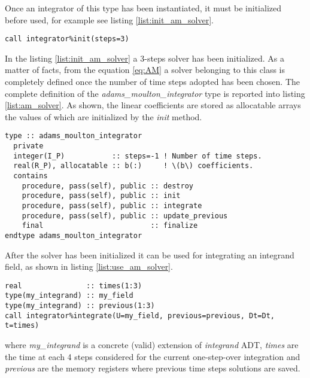 Once an integrator of this type has been instantiated, it must be initialized before used, for example see listing \ref{list:init_am_solver}.

\begin{lstlisting}[firstnumber=1,style=code,caption={example of initialization of an implicit Adams-Moulton integrator},label={list:init_am_solver}]
call integrator%init(steps=3)
\end{lstlisting}

In the listing \ref{list:init_am_solver} a 3-steps solver has been initialized. As a matter of facts, from the equation \ref{eq:AM} a solver belonging to this class is completely defined once the number of time steps adopted has been chosen. The complete definition of the \emph{adams\_moulton\_integrator} type is reported into listing \ref{list:am_solver}. As shown, the linear coefficients are stored as allocatable arrays the values of which are initialized by the \emph{init} method.

\begin{lstlisting}[firstnumber=1,style=code,caption={definition of \emph{adams\_moulton\_integrator} type},label={list:am_solver}]
type :: adams_moulton_integrator
  private
  integer(I_P)           :: steps=-1 ! Number of time steps.
  real(R_P), allocatable :: b(:)     ! \(b\) coefficients.
  contains
    procedure, pass(self), public :: destroy
    procedure, pass(self), public :: init
    procedure, pass(self), public :: integrate
    procedure, pass(self), public :: update_previous
    final                         :: finalize
endtype adams_moulton_integrator
\end{lstlisting}

After the solver has been initialized it can be used for integrating an integrand field, as shown in listing \ref{list:use_am_solver}.

\begin{lstlisting}[firstnumber=1,style=code,caption={example of usage of an Adams-Moulton integrator},label={list:use_am_solver}]
real               :: times(1:3)
type(my_integrand) :: my_field
type(my_integrand) :: previous(1:3)
call integrator%integrate(U=my_field, previous=previous, Dt=Dt, t=times)
\end{lstlisting}
where \emph{my\_integrand} is a concrete (valid) extension of \emph{integrand} ADT, \emph{times} are the time at each 4 steps considered for the current one-step-over integration and \emph{previous} are the memory registers where previous time steps solutions are saved.

